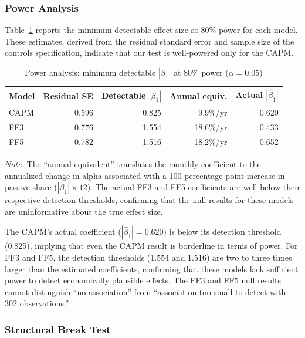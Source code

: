\documentclass[11pt, a4paper]{article}
\begin{document}
\subsubsection{Power Analysis}

Table~\ref{tab:power} reports the minimum detectable effect size at 80\% power for each model. These estimates, derived from the residual standard error and sample size of the controls specification, indicate that our test is well-powered only for the CAPM.

\begin{table}[H]
\centering
\caption{Power analysis: minimum detectable $|\beta_1|$ at 80\% power ($\alpha = 0.05$)}
\label{tab:power}
\small
\begin{tabular}{lrrrr}
\toprule
\textbf{Model} & \textbf{Residual SE} & \textbf{Detectable $|\beta_1|$} & \textbf{Annual equiv.} & \textbf{Actual $|\hat{\beta}_1|$} \\
\midrule
CAPM & 0.596 & 0.825 & 9.9\%/yr & 0.620 \\
FF3  & 0.776 & 1.554 & 18.6\%/yr & 0.433 \\
FF5  & 0.782 & 1.516 & 18.2\%/yr & 0.652 \\
\bottomrule
\end{tabular}
\begin{flushleft}
\small\textit{Note.} The ``annual equivalent'' translates the monthly coefficient to the annualized change in alpha associated with a 100-percentage-point increase in passive share ($|\beta_1| \times 12$). The actual FF3 and FF5 coefficients are well below their respective detection thresholds, confirming that the null results for these models are uninformative about the true effect size.
\end{flushleft}
\end{table}

The CAPM's actual coefficient ($|\hat{\beta}_1| = 0.620$) is below its detection threshold (0.825), implying that even the CAPM result is borderline in terms of power. For FF3 and FF5, the detection thresholds (1.554 and 1.516) are two to three times larger than the estimated coefficients, confirming that these models lack sufficient power to detect economically plausible effects. The FF3 and FF5 null results cannot distinguish ``no association'' from ``association too small to detect with 302 observations.''

\subsubsection{Structural Break Test}
\end{document}
